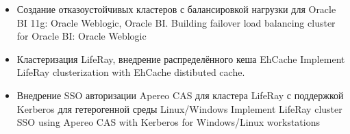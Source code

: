 \documentclass[11pt,a4paper,sans]{moderncv}        %
\begin{document}
{\begin{itemize}
\begin{itemize}
				{Создание отказоустойчивых кластеров с балансировкой нагрузки для разрабатываемых Java-приложений: Corosync/Pacemaker, Nginx, Memcached, Apache Tomcat}
				{Desing and implementation of high loaded fault-tolerant clusters for business Java application: Corosync/Pacemaker, Nginx, Memcached, Apache Tomcat}
			\item {}
				{Создание отказоустойчивых кластеров с балансировкой нагрузки для Oracle BI 11g: Oracle Weblogic, Oracle BI.}
				{Building failover load balancing cluster for Oracle BI: Oracle Weblogic}
			\item {}
				{Кластеризация LifeRay, внедрение распределённого кеша EhCache}
				{Implement LifeRay clusterization with EhCache distibuted cache.}
			\item {}
				{Внедрение SSO авторизации Apereo CAS для кластера LifeRay с поддержкой Kerberos для гетерогенной среды Linux/Windows}
				{Implement LifeRay cluster SSO using Apereo CAS with Kerberos for Windows/Linux workstations}
		\end{itemize}
	\end{itemize}
}

\newpage

%
%
\end{document}
